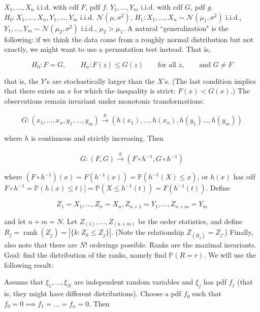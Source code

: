 \begin{example}

\(X_1, \ldots, X_n\) i.i.d. with cdf \(F\), pdf \(f\). \(Y_1, \ldots, Y_m\) i.i.d. with cdf \(G\), pdf \(g\). \(H_0: X_1, \ldots, X_n, Y_1, \ldots, Y_m\) i.i.d. \(\mathcal{N}(\mu, \sigma^2)\), \(H_1: X_1, \ldots, X_n \sim \mathcal{N}(\mu_1, \sigma^2)\) i.i.d., \(Y_1, \ldots, Y_m \sim \mathcal{N}(\mu_2, \sigma^2)\) i.i.d., \(\mu_2 > \mu_1\). A natural ``generalization" is the following: if we think the data come from a roughly normal distribution but not exactly, we might want to use a permutation test instead. That is,

\[
H_0: F = G, \qquad H_a: F(z) \leq G(z) \qquad \text{for all } z, \qquad \text{and } G \neq F
\]

that is, the \(Y\)'s are stochastically larger than the \(X\)'s. (The last condition implies that there exists an \(x\) for which the inequality is strict: \(F(x) < G(x)\).) The observations remain invariant under monotonic transformations:

\[
G:(x_1, \ldots, x_n, y_1, \ldots, y_m) \xrightarrow{g} ( h(x_1), \ldots, h(x_n), h(y_1) \ldots, h(y_m))
\]

 where \(h\) is continuous and strictly increasing. Then

\[
\overline{G}: (F, G) \xrightarrow{\overline{g}} (F \circ h^{-1}, G \circ h^{-1})
\]

where \( (F \circ h^{-1})(x) = F( h^{-1}(x)) = \mathbb{P}(h^{-1}(X) \leq x)\), or \(h(x)\) has cdf \(F \circ h^{-1} = \mathbb{P}(h(x) \leq t)]= \mathbb{P}(X \leq h^{-1}(t)) = F(h^{-1}(t))\). Define

\[
Z_1 = X_1, \ldots, Z_n = X_n, Z_{n+1} = Y_1, \ldots, Z_{n+m} = Y_m
\]

and let \(n +m = N\). Let \(Z_{(1)}, \ldots, Z_{(n+m)}\) be the order statistics, and define \(R_j = \operatorname{rank}(Z_j) = |\{k: Z_k \leq Z_j\}|\). (Note the relationship \(Z_{(R_j)} = Z_j\).) Finally, also note that there are \(N!\) orderings possible. Ranks are the maximal invariants. Goal: find the distribution of the ranks, namely find \(\mathbb{P}(R = r)\). We will use the following result:

\begin{theorem}

Assume that \(\xi_1, \ldots, \xi_N\) are independent random variables and \(\xi_j\) has pdf \(f_j\) (that is, they might have different distributions). Choose a pdf \(f_0\) such that \(f_0 = 0 \implies f_1 = \ldots = f_n = 0\). Then


\end{theorem}
\end{example}
